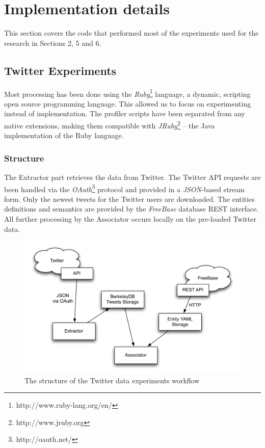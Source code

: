 \section{Implementation details}
This section covers the code that performed most of the experiments used for the research in Sections 2, 5 and 6.

\subsection{Twitter Experiments}
Most processing has been done using the \textit{Ruby}\footnote{http://www.ruby-lang.org/en/}
language, a dynamic, scripting open source programming language. This allowed us
to focus on experimenting instead of implementation. The profiler scripts have been
separated from any native extensions, making them compatible with \textit{JRuby}\footnote{http://www.jruby.org} -- the Java implementation
of the Ruby language.
\subsubsection{Structure}
The Extractor part retrieves the data from Twitter. The Twitter API requests are been handled via the \textit{OAuth}\footnote{http://oauth.net/} protocol and provided in a
\textit{JSON}-based stream form. Only the newest tweets for the Twitter
users are downloaded. The entities definitions and semantics are provided by
the \textit{FreeBase} database REST interface. All further processing by the Associator
occurs locally on the pre-loaded Twitter data. \\

\begin{figure}[h!]
  \begin{center}
	  \includegraphics[scale=0.65]{images/twitter_diagram.pdf}
	  \caption{The structure of the Twitter data experiments workflow}
  \end{center}
\end{figure}

